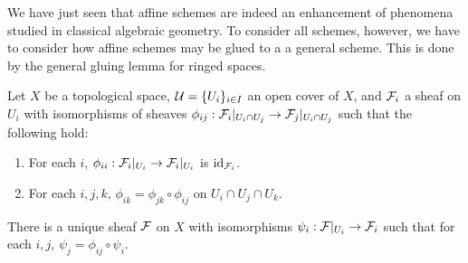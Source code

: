 We have just seen that affine schemes are indeed an enhancement of phenomena studied in classical algebraic geometry. To consider all schemes, however, we have to consider how affine schemes may be glued to a a general scheme. This is done by the general gluing lemma for ringed spaces. 
\begin{proposition}\label{prop: gluing sheaves}
    Let $X$ be a topological space, $\mathcal{U}=\{U_{i}\}_{i\in I}$ an open cover of $X$, and $\mathcal{F}_{i}$ a sheaf on $U_{i}$ with isomorphisms of sheaves $\phi_{ij}:\mathcal{F}_{i}|_{U_{i}\cap U_{j}}\to\mathcal{F}_{j}|_{U_{i}\cap U_{j}}$ such that the following hold:
    \begin{enumerate}[label=(\arabic*)]
        \item For each $i$, $\phi_{ii}:\mathcal{F}_{i}|_{U_{i}}\to\mathcal{F}_{i}|_{U_{i}}$ is $\mathrm{id}_{\mathcal{F}_{i}}$. 
        \item For each $i,j,k$, $\phi_{ik}=\phi_{jk}\circ\phi_{ij}$ on $U_{i}\cap U_{j}\cap U_{k}$. 
    \end{enumerate}
    There is a unique sheaf $\mathcal{F}$ on $X$ with isomorphisms $\psi_{i}:\mathcal{F}|_{U_{i}}\to\mathcal{F}_{i}$ such that for each $i,j$, $\psi_{j}=\phi_{ij}\circ\psi_{i}$. 
\end{proposition}
